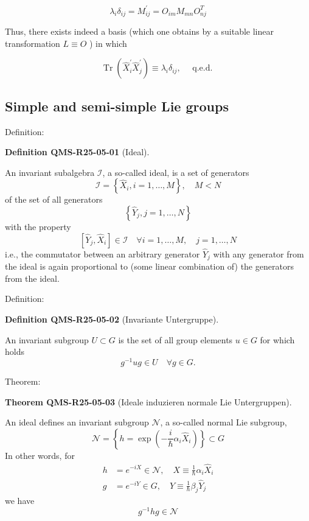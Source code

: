 \documentclass[10pt, letterpaper]{article}
\newcommand{\CustomHeading}[3]{%
  \par\medskip\noindent%
  \textbf{#1 #2} \textnormal{(#3)}.\enskip%
}
\newenvironment{DEF}[2]{\begin{unitbox}\CustomHeading{Definition}{#1}{#2}}{\end{unitbox}}
\newenvironment{THEO}[2]{\begin{unitbox}\CustomHeading{Theorem}{#1}{#2}}{\end{unitbox}}
\begin{document}
$$
\lambda_{i} \delta_{i j}=M_{i j}^{\prime}=O_{i m} M_{m n} O_{n j}^{T}
$$

Thus, there exists indeed a basis (which one obtains by a suitable linear transformation $L \equiv O$ ) in which

$$
\operatorname{Tr}\left(\hat{X}_{i}^{\prime} \hat{X}_{j}^{\prime}\right) \equiv \lambda_{i} \delta_{i j}, \quad \text { q.e.d. }
$$







\pagebreak

\subsection{Simple and semi-simple Lie groups}
Definition: 


\begin{DEF}{QMS-R25-05-01}{Ideal}
An invariant subalgebra $\mathcal{I}$, a so-called ideal, is a set of generators
$$
\mathcal{I}=\left\{\hat{X}_{i}, i=1, \ldots, M\right\}, \quad M<N
$$
of the set of all generators
$$
\left\{\hat{Y}_{j}, j=1, \ldots, N\right\}
$$
with the property
$$
\left[\hat{Y}_{j}, \hat{X}_{i}\right] \in \mathcal{I} \quad \forall i=1, \ldots, M, \quad j=1, \ldots, N
$$
i.e., the commutator between an arbitrary generator $\hat{Y}_{j}$ with any generator from the ideal is again proportional to (some linear combination of) the generators from the ideal.
\end{DEF}



Definition: 


\begin{DEF}{QMS-R25-05-02}{Invariante Untergruppe}
An invariant subgroup $U \subset G$ is the set of all group elements $u \in G$ for which holds
$$
g^{-1} u g \in U \quad \forall g \in G .
$$
\end{DEF}


Theorem: 


\begin{THEO}{QMS-R25-05-03}{Ideale induzieren normale Lie Untergruppen}
An ideal defines an invariant subgroup $\mathcal{N}$, a so-called normal Lie subgroup,
$$
\mathcal{N}=\left\{h=\exp \left(-\frac{i}{\hbar} \alpha_{i} \hat{X}_{i}\right)\right\} \subset G
$$
In other words, for
$$
\begin{aligned}
h & =e^{-i X} \in \mathcal{N}, \quad X \equiv \frac{1}{\hbar} \alpha_{i} \hat{X}_{i} \\
g & =e^{-i Y} \in G, \quad Y \equiv \frac{1}{\hbar} \beta_{j} \hat{Y}_{j}
\end{aligned}
$$
we have
$$
g^{-1} h g \in \mathcal{N}
$$
\end{THEO}
\end{document}
